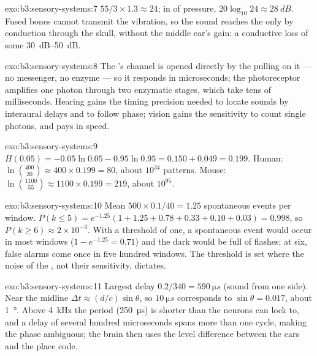 \begin{solution}{exo:b3:sensory-systems:7}
$55/3\times 1.3 \approx 24$; in  of pressure, $20\log_{10}24
\approx \qty{28}{dB}$. Fused bones cannot transmit the vibration, so
the sound reaches the  only by conduction through the skull,
without the middle ear's gain: a conductive loss of some
\qtyrange{30}{50}{dB}.
\end{solution}

\begin{solution}{exo:b3:sensory-systems:8}
The 's channel is opened directly by the  pulling on
it --- no messenger, no enzyme --- so it responds in microseconds; the
photoreceptor amplifies one photon through two enzymatic stages, which
take tens of milliseconds. Hearing gains the timing precision needed to
locate sounds by interaural delays and to follow phase; vision gains
the sensitivity to count single photons, and pays in speed.
\end{solution}

\begin{solution}{exo:b3:sensory-systems:9}
$H(0.05) = -0.05\ln 0.05 - 0.95\ln 0.95 = 0.150 + 0.049 = 0.199$.
Human: $\ln\binom{400}{20} \approx 400\times 0.199 = 80$, about
$10^{34}$ patterns. Mouse: $\ln\binom{1100}{55} \approx 1100\times 0.199
= 219$, about $10^{95}$.
\end{solution}

\begin{solution}{exo:b3:sensory-systems:10}
Mean $500\times 0.1/40 = 1.25$ spontaneous events per window. $P(k
\le 5) = e^{-1.25}(1 + 1.25 + 0.78 + 0.33 + 0.10 + 0.03) = 0.998$, so
$P(k \ge 6) \approx 2\times 10^{-3}$. With a threshold of one, a
spontaneous event would occur in most windows ($1 - e^{-1.25} = 0.71$)
and the dark would be full of flashes; at six, false alarms come once
in five hundred windows. The threshold is set where the noise of the
, not their sensitivity, dictates.
\end{solution}

\begin{solution}{exo:b3:sensory-systems:11}
Largest delay $0.2/340 = \qty{590}{\micro s}$ (sound from one side).
Near the midline $\Delta t \approx (d/c)\sin\theta$, so $\qty{10}{\micro
s}$ corresponds to $\sin\theta = 0.017$, about \qty{1}{\degree}. Above
\qty{4}{kHz} the period (\qty{250}{\micro s}) is shorter than the
neurons can lock to, and a delay of several hundred microseconds spans
more than one cycle, making the phase ambiguous; the brain then uses
the level difference between the ears and the place code.
\end{solution}

